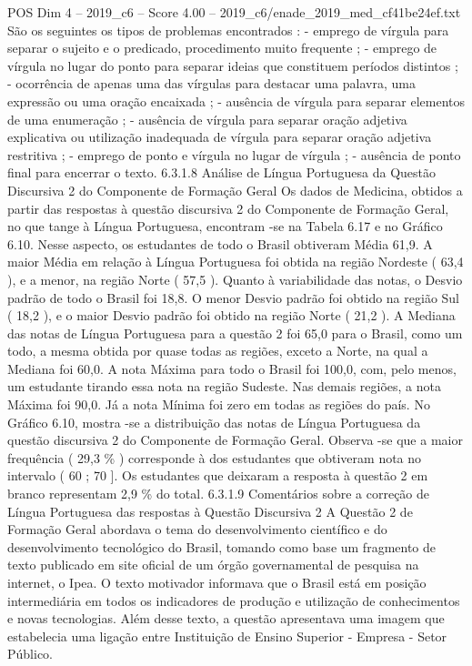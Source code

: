 \begin{textsample}{POS Dim 4 – 2019\_c6 – Score 4.00 – 2019\_c6/enade\_2019\_med\_cf41be24ef.txt}
São os seguintes os tipos de problemas encontrados : - emprego de vírgula para separar o sujeito e o predicado, procedimento muito frequente ; - emprego de vírgula no lugar do ponto para separar ideias que constituem períodos distintos ; - ocorrência de apenas uma das vírgulas para destacar uma palavra, uma expressão ou uma oração encaixada ; - ausência de vírgula para separar elementos de uma enumeração ; - ausência de vírgula para separar oração adjetiva explicativa ou utilização inadequada de vírgula para separar oração adjetiva restritiva ; - emprego de ponto e vírgula no lugar de vírgula ; - ausência de ponto final para encerrar o texto. 6.3.1.8 Análise de Língua Portuguesa da Questão Discursiva 2 do Componente de Formação Geral Os dados de Medicina, obtidos a partir das respostas à questão discursiva 2 do Componente de Formação Geral, no que tange à Língua Portuguesa, encontram -se na Tabela 6.17 e no Gráfico 6.10.
Nesse aspecto, os estudantes de todo o Brasil obtiveram Média 61,9.
A maior Média em relação à Língua Portuguesa foi obtida na região Nordeste ( 63,4 ), e a menor, na região Norte ( 57,5 ).
Quanto à variabilidade das notas, o Desvio padrão de todo o Brasil foi 18,8.
O menor Desvio padrão foi obtido na região Sul ( 18,2 ), e o maior Desvio padrão foi obtido na região Norte ( 21,2 ).
A Mediana das notas de Língua Portuguesa para a questão 2 foi 65,0 para o Brasil, como um todo, a mesma obtida por quase todas as regiões, exceto a Norte, na qual a Mediana foi 60,0.
A nota Máxima para todo o Brasil foi 100,0, com, pelo menos, um estudante tirando essa nota na região Sudeste.
Nas demais regiões, a nota Máxima foi 90,0.
Já a nota Mínima foi zero em todas as regiões do país.
No Gráfico 6.10, mostra -se a distribuição das notas de Língua Portuguesa da questão discursiva 2 do Componente de Formação Geral.
Observa -se que a maior frequência ( 29,3 \% ) corresponde à dos estudantes que obtiveram nota no intervalo ( 60 ; 70 ].
Os estudantes que deixaram a resposta à questão 2 em branco representam 2,9 \% do total. 6.3.1.9 Comentários sobre a correção de Língua Portuguesa das respostas à Questão Discursiva 2 A Questão 2 de Formação Geral abordava o tema do desenvolvimento científico e do desenvolvimento tecnológico do Brasil, tomando como base um fragmento de texto publicado em site oficial de um órgão governamental de pesquisa na internet, o Ipea.
O texto motivador informava que o Brasil está em posição intermediária em todos os indicadores de produção e utilização de conhecimentos e novas tecnologias.
Além desse texto, a questão apresentava uma imagem que estabelecia uma ligação entre Instituição de Ensino Superior - Empresa - Setor Público.

\end{textsample}
